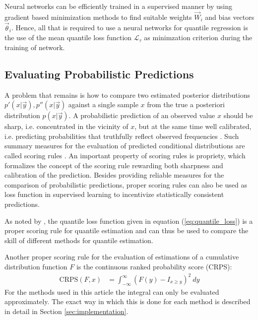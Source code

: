 \documentclass[journal abbreviation, manuscript]{copernicus}
\begin{document}
Neural networks can be efficiently trained in a supervised manner by using
gradient based minimization methods to find suitable weights $\vec{W}_i$ and
bias vectors $\vec{\theta}_i$. Hence, all that is required to use a neural networks
for quantile regression is the use of the mean quantile loss function
$\mathcal{L}_\tau$ as minimzation criterion during the training of network.
    
\subsection{Evaluating Probabilistic Predictions}

  A problem that remains is how to compare two estimated posterior distributions
  $p'(x | \vec{y}), p''(x | \vec{y})$ against a single sample $x$ from the true
  a posteriori distribution $p(x | \vec{y})$. A probabilistic prediction of an
  observed value $x$ should be sharp, i.e. concentrated in the vicinity of
  $x$, but at the same time well calibrated, i.e. predicting probabilities
  that truthfully reflect observed frequencies \citep{gneiting_2}. Such summary
  measures for the evaluation of predicted conditional distributions are called
  scoring rules \citep{gneiting}. An important property of scoring rules
  is propriety, which formalizes the concept of the scoring rule rewarding both
  sharpness and calibration of the prediction. Besides providing reliable
  measures for the comparison of probabilistic predictions, proper scoring rules
  can also be used as loss function in supervised learning to incentivize
  statistically consistent predictions.

  As noted by \cite{gneiting}, the quantile loss function given in equation
  (\ref{eq:quantile_loss}) is a proper scoring rule for quantile estimation
  and can thus  be used to compare the skill of different methods for
  quantile estimation.

  Another proper scoring rule for the evaluation of estimations of a
  cumulative distribution function $F$ is the continuous ranked probability
  score (CRPS):
  \begin{align}\label{eq:crps}
    \text{CRPS}(F, x) &= \int_{-\infty}^{\infty} 
    \left ( F(y) - I_{x \geq y} \right )^2 \: dy
  \end{align}
  For the methods used in this article the integral  can only
  be evaluated approximately. The exact way in which this is done for each
  method is described in detail in Section \ref{sec:implementation}.
\end{document}
